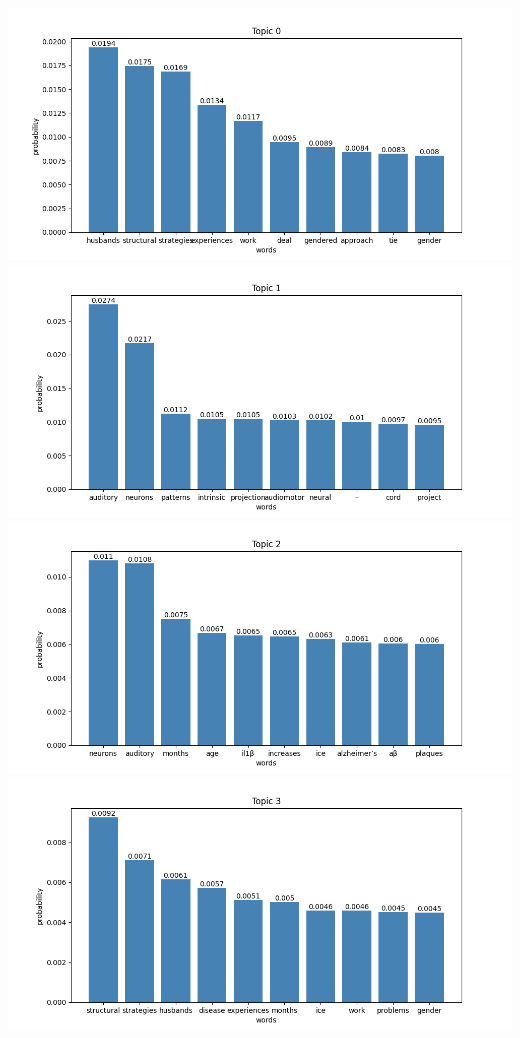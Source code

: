 \documentclass[10pt]{article} %
\begin{document}
	\begin{center}
		\includegraphics[scale=0.6]{images/plots/test_8_no_stopwords/topic_0.png}
		\includegraphics[scale=0.6]{images/plots/test_8_no_stopwords/topic_1.png}
		\includegraphics[scale=0.6]{images/plots/test_8_no_stopwords/topic_2.png}
		\includegraphics[scale=0.6]{images/plots/test_8_no_stopwords/topic_3.png}\

\end{center}
\end{document}
